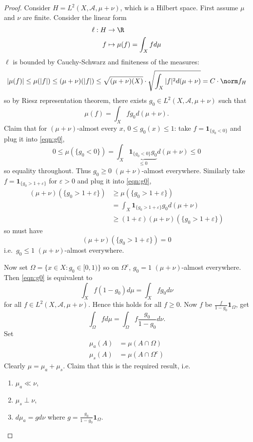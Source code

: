 \documentclass[a4paper]{article}
\begin{document}
\begin{proof}
  Consider \(H = L^2(X, \mathcal A, \mu + \nu)\), which is a Hilbert space. First assume \(\mu\) and \(\nu\) are finite. Consider the linear form
  \begin{align*}
    \ell: H &\to \R \\
    f &\mapsto \mu(f) = \int_X f d\mu
  \end{align*}
  \(\ell\) is bounded by Cauchy-Schwarz and finiteness of the measures:
  \[
    |\mu(f)|
    \leq \mu(|f|)
    \leq (\mu + \nu)(|f|)
    \leq \sqrt{(\mu + \nu)(X)} \cdot \sqrt{\int_X |f|^2 d(\mu + \nu)}
    = C \cdot \norm f_H
  \]
  so by Riesz representation theorem, there exists \(g_0 \in L^2(X, \mathcal A, \mu + \nu)\) such that
  \[
    \label{eqn:g0}
    \mu(f) = \int_X fg_0 d(\mu + \nu).
    \tag{\ast}
  \]
  Claim that for \((\mu + \nu)\)-almost every \(x\), \(0 \leq g_0(x) \leq 1\): take \(f = \mathbf 1_{\{g_0 < 0\}}\) and plug it into \eqref{eqn:g0},
  \[
    0
    \leq \mu(\{g_0 < 0\})
    = \int_X \underbrace{\mathbf 1_{\{g_0 < 0\}} g_0}_{\leq 0} d(\mu + \nu)
    \leq 0
  \]
  so equality throughout. Thus \(g_0 \geq 0\) \((\mu + \nu)\)-almost everywhere. Similarly take \(f = \mathbf 1_{\{g_0 > 1 + \varepsilon\}}\) for \(\varepsilon > 0\) and plug it into \eqref{eqn:g0},
  \begin{align*}
    (\mu + \nu) (\{g_0 > 1 + \varepsilon\})
    &\geq \mu(\{g_0 > 1 + \varepsilon\}) \\
    &= \int_X \mathbf 1_{\{g_0 > 1 + \varepsilon\}} g_0 d(\mu + \nu) \\
    &\geq (1 + \varepsilon) (\mu + \nu)(\{g_0 > 1 + \varepsilon\})
  \end{align*}
  so must have
  \[
    (\mu + \nu) (\{g_0 > 1 + \varepsilon\}) = 0
  \]
  i.e.\ \(g_0 \leq 1\) \((\mu + \nu)\)-almost everywhere.

  Now set \(\Omega = \{x \in X: g_0 \in [0, 1)\}\) so on \(\Omega^c\), \(g_0 = 1\) \((\mu + \nu)\)-almost everywhere. Then \eqref{eqn:g0} is equivalent to
  \[
    \int_X f(1 - g_0) d\mu = \int_X fg_0 d\nu
  \]
  for all \(f \in L^2(X, \mathcal A, \mu + \nu)\). Hence this holds for all \(f \geq 0\). Now \(f\) be \(\frac{f}{1 - g_0} \mathbf 1_\Omega\), get
  \[
    \label{eqn:Radon-Nikodym}
    \int_\Omega f d\mu = \int_\Omega f \frac{g_0}{1 - g_0} d\nu.
    \tag{\ast\ast}
  \]
  Set
  \begin{align*}
    \mu_a(A) &= \mu(A \cap \Omega) \\
    \mu_s(A) &= \mu(A \cap \Omega^c)
  \end{align*}
  Clearly \(\mu = \mu_a + \mu_s\). Claim that this is the required result, i.e.
  \begin{enumerate}
  \item \(\mu_a \ll \nu\),
  \item \(\mu_s \perp \nu\),
  \item \(d\mu_a = gd\nu\) where \(g = \frac{g_0}{1 - g_0} \mathbf 1_\Omega\).
  \end{enumerate}


\end{proof}
\end{document}
